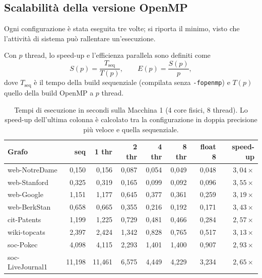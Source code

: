 \documentclass[11pt,a4paper]{article}
\newcommand{\stacco}{\par\medskip\noindent}
\begin{document}
\subsection{Scalabilità della versione OpenMP}
\label{sec:scalabilita}
Ogni configurazione è stata eseguita tre volte; si riporta il minimo,
visto che l'attività di sistema può rallentare un'esecuzione.

\stacco
Con $p$ thread, lo speed-up e l'efficienza parallela sono definiti come
\begin{equation}
S(p) = \frac{T_{\mathrm{seq}}}{T(p)},
\qquad
E(p) = \frac{S(p)}{p},
\label{eq:speedup}
\end{equation}
dove $T_{\mathrm{seq}}$ è il tempo della build sequenziale (compilata senza
\texttt{-fopenmp}) e $T(p)$ quello della build OpenMP a $p$ thread.

\begin{table}[h]
\centering
\caption{Tempi di esecuzione in secondi sulla Macchina 1 (4 core
fisici, 8 thread). Lo speed-up dell'ultima colonna è
calcolato tra la configurazione in doppia precisione più veloce e quella sequenziale.}
\label{tab:scaling}
\begin{tabular}{@{}lrrrrrrr@{}}
\toprule
\textbf{Grafo} & \textbf{seq} & \textbf{1 thr} & \textbf{2 thr} &
\textbf{4 thr} & \textbf{8 thr} & \textbf{float 8} & \textbf{speed-up} \\
\midrule
web-NotreDame    & 0,150  & 0,156  & 0,087 & 0,054 & 0,049 & 0,048 & $3{,}04\times$ \\
web-Stanford     & 0,325  & 0,319  & 0,165 & 0,099 & 0,092 & 0,096 & $3{,}55\times$ \\
web-Google       & 1,151  & 1,177  & 0,645 & 0,377 & 0,361 & 0,259 & $3{,}19\times$ \\
web-BerkStan     & 0,658  & 0,665  & 0,355 & 0,216 & 0,192 & 0,171 & $3{,}43\times$ \\
cit-Patents      & 1,199  & 1,225  & 0,729 & 0,481 & 0,466 & 0,284 & $2{,}57\times$ \\
wiki-topcats     & 2,397  & 2,424  & 1,342 & 0,828 & 0,765 & 0,517 & $3{,}13\times$ \\
soc-Pokec        & 4,098  & 4,115  & 2,293 & 1,401 & 1,400 & 0,907 & $2{,}93\times$ \\
soc-LiveJournal1 & 11,198 & 11,461 & 6,575 & 4,449 & 4,229 & 3,234 & $2{,}65\times$ \\
\bottomrule
\end{tabular}
\end{table}
\end{document}
